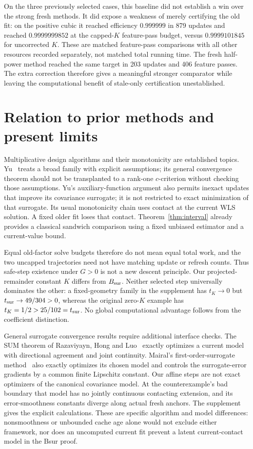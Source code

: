 \documentclass[11pt]{article}
\begin{document}
On the three previously selected cases, this baseline did not establish a win over the strong fresh methods. It did expose a weakness of merely certifying the old fit: on the positive cubic it reached efficiency $0.999999$ in 879 updates and reached $0.9999999852$ at the capped-$K$ feature-pass budget, versus $0.9999101845$ for uncorrected $K$. These are matched feature-pass comparisons with all other resources recorded separately, not matched total running time. The fresh half-power method reached the same target in 203 updates and 406 feature passes. The extra correction therefore gives a meaningful stronger comparator while leaving the computational benefit of stale-only certification unestablished.

\section{Relation to prior methods and present limits}
Multiplicative design algorithms and their monotonicity are established topics.
Yu~\cite{yu2010} treats a broad family with explicit assumptions; its general convergence theorem should not be transplanted to a rank-one $c$-criterion without checking those assumptions.
Yu's auxiliary-function argument also permits inexact updates that improve its covariance surrogate; it is not restricted to exact minimization of that surrogate. Its usual monotonicity chain uses contact at the current WLS solution. A fixed older fit loses that contact. Theorem~\ref{thm:interval} already provides a classical sandwich comparison using a fixed unbiased estimator and a current-value bound.

Equal old-factor solve budgets therefore do not mean equal total work, and the two uncapped trajectories need not have matching update or refresh counts. Thus safe-step existence under $G>0$ is not a new descent principle. Our projected-remainder constant $K$ differs from $B_{\rm sur}$. Neither selected step universally dominates the other: a fixed-geometry family in the supplement has $t_K\to0$ but $t_{\rm sur}\to49/304>0$, whereas the original zero-$K$ example has $t_K=1/2>25/102=t_{\rm sur}$. No global computational advantage follows from the coefficient distinction.

General surrogate convergence results require additional interface checks. The SUM theorem of Razaviyayn, Hong and Luo~\cite[Assumption~1 and Theorem~1, arXiv v1]{razaviyayn2013} exactly optimizes a current model with directional agreement and joint continuity. Mairal's first-order-surrogate method~\cite[Definition~2.2 and Proposition~2.5]{mairal2015} also exactly optimizes its chosen model and controls the surrogate-error gradients by a common finite Lipschitz constant. Our affine steps are not exact optimizers of the canonical covariance model. At the counterexample's bad boundary that model has no jointly continuous contacting extension, and its error-smoothness constants diverge along actual fresh anchors. The supplement gives the explicit calculations. These are specific algorithm and model differences: nonsmoothness or unbounded cache age alone would not exclude either framework, nor does an uncomputed current fit prevent a latent current-contact model in the Bsur proof.
\end{document}
